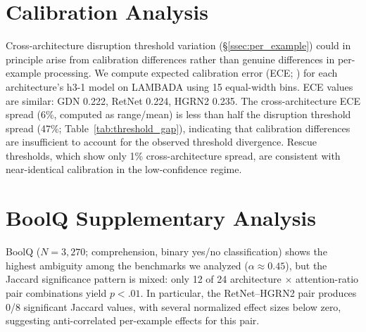 \begin{table}[ht]
\centering
\small
\caption{Gaussian-intersection prediction thresholds ($|\log p|$) across architectures. Relative spread: range/mean.}
\label{tab:threshold_gap}
\end{table}

\section{Calibration Analysis}\label{app:calibration}

Cross-architecture disruption threshold variation (\S\ref{ssec:per_example}) could in principle arise from calibration differences rather than genuine differences in per-example processing. We compute expected calibration error (ECE; \citealt{guo2017calibration}) for each architecture's h3-1 model on LAMBADA using 15 equal-width bins. ECE values are similar: GDN 0.222, RetNet 0.224, HGRN2 0.235. The cross-architecture ECE spread (6\%, computed as range/mean) is less than half the disruption threshold spread (47\%; Table~\ref{tab:threshold_gap}), indicating that calibration differences are insufficient to account for the observed threshold divergence. Rescue thresholds, which show only 1\% cross-architecture spread, are consistent with near-identical calibration in the low-confidence regime.

\section{BoolQ Supplementary Analysis}
\label{app:boolq}

BoolQ ($N = 3{,}270$; comprehension, binary yes/no classification) shows the highest ambiguity among the benchmarks we analyzed ($\alpha \approx 0.45$), but the Jaccard significance pattern is mixed: only 12 of 24 architecture $\times$ attention-ratio pair combinations yield $p < .01$. In particular, the RetNet--HGRN2 pair produces 0/8 significant Jaccard values, with several normalized effect sizes below zero, suggesting anti-correlated per-example effects for this pair.


